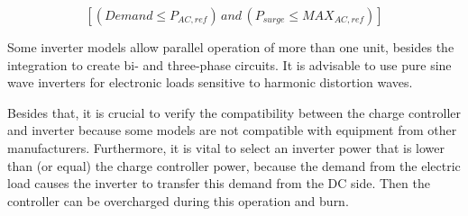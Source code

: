 \documentclass[12pt,a4paper]{article}
\begin{document}
\begin{equation}
\label{eq:invcheck} 
\left[ (Demand \leq P_{AC,ref}) \, and \, (P_{surge} \leq MAX_{AC,ref}) \right]
\end{equation}

Some inverter models allow parallel operation of more than one unit, besides the integration to create bi- and three-phase circuits. It is advisable to use pure sine wave inverters for electronic loads sensitive to harmonic distortion waves.

Besides that, it is crucial to verify the compatibility between the charge controller and inverter because some models are not compatible with equipment from other manufacturers. Furthermore, it is vital to select an inverter power that is lower than (or equal) the charge controller power, because the demand from the electric load causes the inverter to transfer this demand from the DC side. Then the controller can be overcharged during this operation and burn.



\end{document}
